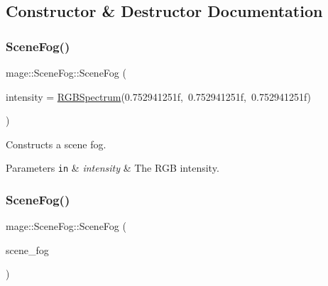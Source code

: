 \subsection{Constructor \& Destructor Documentation}
\hypertarget{structmage_1_1_scene_fog_a8d7c8ab962ca172a5bca7115131f6afc}{}\label{structmage_1_1_scene_fog_a8d7c8ab962ca172a5bca7115131f6afc} 
\subsubsection{\texorpdfstring{Scene\+Fog()}{SceneFog()}\hspace{0.1cm}{\footnotesize\ttfamily [1/3]}}
{\footnotesize\ttfamily mage\+::\+Scene\+Fog\+::\+Scene\+Fog (\begin{DoxyParamCaption}\item[{const \hyperlink{structmage_1_1_r_g_b_spectrum}{R\+G\+B\+Spectrum} \&}]{intensity = {\ttfamily \hyperlink{structmage_1_1_r_g_b_spectrum}{R\+G\+B\+Spectrum}(0.752941251f,~0.752941251f,~0.752941251f)} }\end{DoxyParamCaption})\hspace{0.3cm}{\ttfamily [explicit]}}

Constructs a scene fog.


\begin{DoxyParams}[1]{Parameters}
\mbox{\tt in}  & {\em intensity} & The R\+GB intensity. \\
\hline
\end{DoxyParams}
\hypertarget{structmage_1_1_scene_fog_a203934b340b718f9b6f136100df62268}{}\label{structmage_1_1_scene_fog_a203934b340b718f9b6f136100df62268} 
\subsubsection{\texorpdfstring{Scene\+Fog()}{SceneFog()}\hspace{0.1cm}{\footnotesize\ttfamily [2/3]}}
{\footnotesize\ttfamily mage\+::\+Scene\+Fog\+::\+Scene\+Fog (\begin{DoxyParamCaption}\item[{const \hyperlink{structmage_1_1_scene_fog}{Scene\+Fog} \&}]{scene\+\_\+fog }\end{DoxyParamCaption})\hspace{0.3cm}{\ttfamily [default]}}

